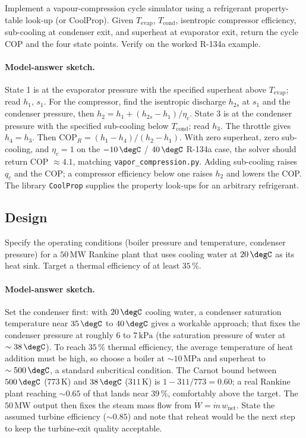 \begin{exercise}
Implement a vapour-compression cycle simulator using a refrigerant
property-table look-up (or CoolProp). Given $T_{\text{evap}}$,
$T_{\text{cond}}$, isentropic compressor efficiency, sub-cooling at
condenser exit, and superheat at evaporator exit, return the cycle
COP and the four state points. Verify on the worked R-134a example.

\paragraph{Model-answer sketch.} State 1 is at the evaporator pressure
with the specified superheat above $T_{\text{evap}}$; read $h_1$, $s_1$.
For the compressor, find the isentropic discharge $h_{2s}$ at $s_1$ and
the condenser pressure, then $h_2 = h_1 + (h_{2s} - h_1)/\eta_c$. State 3
is at the condenser pressure with the specified sub-cooling below
$T_{\text{cond}}$; read $h_3$. The throttle gives $h_4 = h_3$. Then
$\text{COP}_R = (h_1 - h_4)/(h_2 - h_1)$. With zero superheat, zero
sub-cooling, and $\eta_c = 1$ on the $-10\,\degC$ / $40\,\degC$ R-134a
case, the solver should return COP $\approx 4.1$, matching
\texttt{vapor\_compression.py}. Adding sub-cooling raises $q_c$ and the
COP; a compressor efficiency below one raises $h_2$ and lowers the COP.
The library \texttt{CoolProp} supplies the property look-ups for an
arbitrary refrigerant.
\end{exercise}

\subsection*{Design}

\begin{exercise}
Specify the operating conditions (boiler pressure and temperature,
condenser pressure) for a $50\,\text{MW}$ Rankine plant that uses
cooling water at $20\,\degC$ as its heat sink. Target a thermal
efficiency of at least $35\,\%$.

\paragraph{Model-answer sketch.} Set the condenser first: with
$20\,\degC$ cooling water, a condenser saturation temperature near
$35\,\degC$ to $40\,\degC$ gives a workable approach; that fixes the
condenser pressure at roughly $6$ to $7\,\text{kPa}$ (the saturation
pressure of water at $\sim 38\,\degC$). To reach $35\,\%$ thermal
efficiency, the average temperature of heat addition must be high, so
choose a boiler at $\sim 10\,\text{MPa}$ and superheat to $\sim
500\,\degC$, a standard subcritical condition. The Carnot bound between
$500\,\degC$ ($773\,\si{\kelvin}$) and $38\,\degC$ ($311\,\si{\kelvin}$)
is $1 - 311/773 = 0.60$; a real Rankine plant reaching $\sim 0.65$ of
that lands near $39\,\%$, comfortably above the target. The
$50\,\text{MW}$ output then fixes the steam mass flow from $\dot W =
\dot m \, w_{\text{net}}$. State the assumed turbine efficiency
($\sim 0.85$) and note that reheat would be the next step to keep the
turbine-exit quality acceptable.
\end{exercise}

